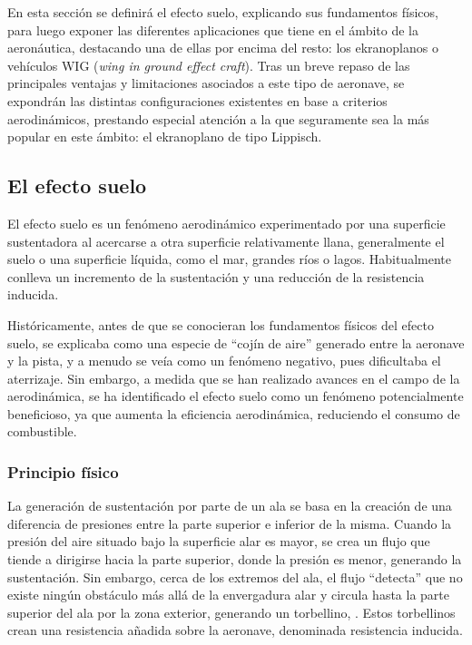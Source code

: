 En esta sección se definirá el efecto suelo, explicando sus fundamentos físicos, para luego exponer las diferentes aplicaciones que tiene en el ámbito de la aeronáutica, destacando una de ellas por encima del resto: los ekranoplanos o vehículos WIG (\emph{wing in ground effect craft}). Tras un breve repaso de las principales ventajas y limitaciones asociados a este tipo de aeronave, se expondrán las distintas configuraciones existentes en base a criterios aerodinámicos, prestando especial atención a la que seguramente sea la más popular en este ámbito: el ekranoplano de tipo Lippisch.


\subsection{El efecto suelo}
\label{sec:wig:ge}

El efecto suelo es un fenómeno aerodinámico experimentado por una superficie sustentadora al acercarse a otra superficie relativamente llana, generalmente el suelo o una superficie líquida, como el mar, grandes ríos o lagos. Habitualmente conlleva un incremento de la sustentación y una reducción de la resistencia inducida.

Históricamente, antes de que se conocieran los fundamentos físicos del efecto suelo, se explicaba como una especie de “cojín de aire” generado entre la aeronave y la pista, y a menudo se veía como un fenómeno negativo, pues dificultaba el aterrizaje. Sin embargo, a medida que se han realizado avances en el campo de la aerodinámica, se ha identificado el efecto suelo como un fenómeno potencialmente beneficioso, ya que aumenta la eficiencia aerodinámica, reduciendo el consumo de combustible.


\subsubsection{Principio físico}
\label{sec:wig:ge:principle}

La generación de sustentación por parte de un ala se basa en la creación de una diferencia de presiones entre la parte superior e inferior de la misma. Cuando la presión del aire situado bajo la superficie alar es mayor, se crea un flujo que tiende a dirigirse hacia la parte superior, donde la presión es menor, generando la sustentación. Sin embargo, cerca de los extremos del ala, el flujo “detecta” que no existe ningún obstáculo más allá de la envergadura alar y circula hasta la parte superior del ala por la zona exterior, generando un torbellino, . Estos torbellinos crean una resistencia añadida sobre la aeronave, denominada resistencia inducida.

